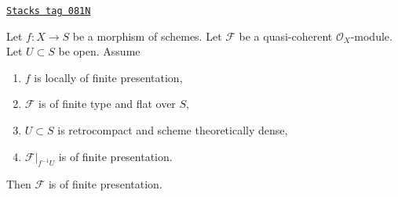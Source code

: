 \begin{lemma}
\label{flat-lemma-flat-finite-type-finitely-presented-over-dense-open}
\href{https://stacks.math.columbia.edu/tag/081N}{\texttt{Stacks tag 081N}}


Let $f : X \to S$ be a morphism of schemes. Let $\mathcal{F}$ be a
quasi-coherent $\mathcal{O}_X$-module. Let $U \subset S$ be open.
Assume
\begin{enumerate}
\item $f$ is locally of finite presentation,
\item $\mathcal{F}$ is of finite type and flat over $S$,
\item $U \subset S$ is retrocompact and scheme theoretically dense,
\item $\mathcal{F}|_{f^{-1}U}$ is of finite presentation.
\end{enumerate}
Then $\mathcal{F}$ is of finite presentation.
\end{lemma}

